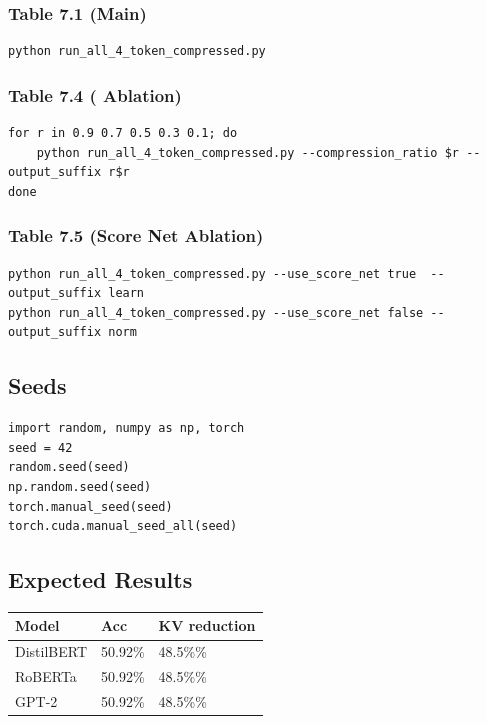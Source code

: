 \subsubsection{Table 7.1 (Main)}
\begin{lstlisting}
python run_all_4_token_compressed.py
\end{lstlisting}

\subsubsection{Table 7.4 (  Ablation)}
\begin{lstlisting}
for r in 0.9 0.7 0.5 0.3 0.1; do
    python run_all_4_token_compressed.py --compression_ratio $r --output_suffix r$r
done
\end{lstlisting}

\subsubsection{Table 7.5 (Score Net Ablation)}
\begin{lstlisting}
python run_all_4_token_compressed.py --use_score_net true  --output_suffix learn
python run_all_4_token_compressed.py --use_score_net false --output_suffix norm
\end{lstlisting}

\subsection{Seeds}

\begin{lstlisting}
import random, numpy as np, torch
seed = 42
random.seed(seed)
np.random.seed(seed)
torch.manual_seed(seed)
torch.cuda.manual_seed_all(seed)
\end{lstlisting}

\subsection{Expected Results}

\begin{table}[H]
\centering
\small
\begin{tabular}{lll}
\toprule
\textbf{Model} & \textbf{Acc} & \textbf{KV reduction} \\
\midrule
DistilBERT & 50.92\% & 48.5\%\% \\
RoBERTa & 50.92\% & 48.5\%\% \\
GPT-2 & 50.92\% & 48.5\%\% \\
\bottomrule
\end{tabular}
\end{table}


